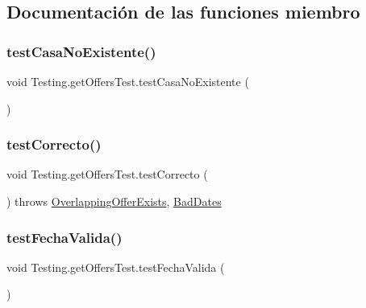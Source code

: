 \subsection{Documentación de las funciones miembro}
\mbox{\label{class_testing_1_1get_offers_test_aab84a688f8f352be6ed2ec1240f5e350}} 
\subsubsection{\texorpdfstring{testCasaNoExistente()}{testCasaNoExistente()}}
{\footnotesize\ttfamily void Testing.\+get\+Offers\+Test.\+test\+Casa\+No\+Existente (\begin{DoxyParamCaption}{ }\end{DoxyParamCaption})}

\mbox{\label{class_testing_1_1get_offers_test_a5e5ead486850d6a541b72cc97dd2efe5}} 
\subsubsection{\texorpdfstring{testCorrecto()}{testCorrecto()}}
{\footnotesize\ttfamily void Testing.\+get\+Offers\+Test.\+test\+Correcto (\begin{DoxyParamCaption}{ }\end{DoxyParamCaption}) throws \mbox{\hyperlink{classexceptions_1_1_overlapping_offer_exists}{Overlapping\+Offer\+Exists}}, \mbox{\hyperlink{classexceptions_1_1_bad_dates}{Bad\+Dates}}}

\mbox{\label{class_testing_1_1get_offers_test_a9ad0a640a38332759435e89eb8f891f5}} 
\subsubsection{\texorpdfstring{testFechaValida()}{testFechaValida()}}
{\footnotesize\ttfamily void Testing.\+get\+Offers\+Test.\+test\+Fecha\+Valida (\begin{DoxyParamCaption}{ }\end{DoxyParamCaption})}

